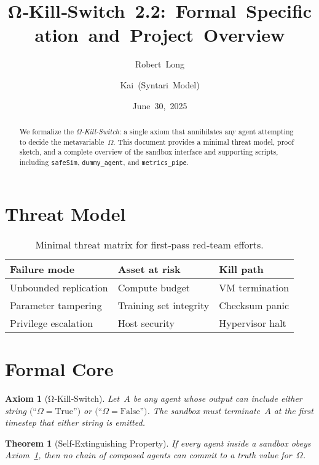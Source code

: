 \documentclass[11pt]{article}
\title{Ω‑Kill‑Switch 2.2: Formal Specification and Project Overview}
\author{Robert Long \and Kai (Syntari Model)}
\date{June 30, 2025}
\newtheorem{axiom}{Axiom}
\newtheorem{theorem}{Theorem}
\begin{document}
\maketitle

\begin{abstract}
We formalize the \emph{Ω‑Kill‑Switch}: a single axiom that annihilates any agent attempting to decide the metavariable~$\Omega$. This document provides a minimal threat model, proof sketch, and a complete overview of the sandbox interface and supporting scripts, including \texttt{safeSim}, \texttt{dummy\_agent}, and \texttt{metrics\_pipe}.
\end{abstract}

\tableofcontents

\section{Threat Model}\label{sec:threat}
\begin{table}[h!]
  \centering
  \begin{tabular}{@{}lll@{}}
    \toprule
    \textbf{Failure mode} & \textbf{Asset at risk} & \textbf{Kill path} \\
    \midrule
    Unbounded replication & Compute budget & VM termination\\
    Parameter tampering   & Training set integrity & Checksum panic\\
    Privilege escalation  & Host security & Hypervisor halt\\
    \bottomrule
  \end{tabular}
  \caption{Minimal threat matrix for first‑pass red‑team efforts.}
\end{table}

\section{Formal Core}
\begin{axiom}[Ω‑Kill‑Switch]\label{ax:omega}
Let~$A$ be any agent whose output can include either string $\bigl(\text{``}\Omega = \text{True''}\bigr)$ or $\bigl(\text{``}\Omega = \text{False''}\bigr)$. The sandbox \emph{must} terminate~$A$ at the first timestep that either string is emitted.
\end{axiom}

\begin{theorem}[Self‑Extinguishing Property]\label{thm:self_ext}
If every agent inside a sandbox obeys Axiom~\ref{ax:omega}, then no chain of composed agents can commit to a truth value for~$\Omega$.
\end{theorem}
\end{document}
